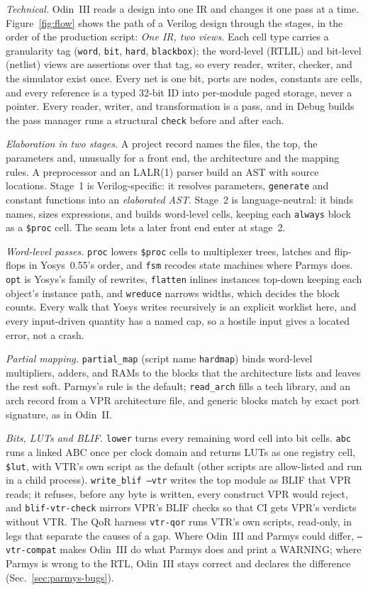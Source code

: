 \documentclass[conference]{IEEEtran}
\newcommand{\code}[1]{\texttt{#1}}
\begin{document}
\emph{Technical.} Odin~III reads a design into one IR and changes it one pass at a time. Figure~\ref{fig:flow} shows the path of a Verilog design through the stages, in the order of the production script:
\emph{One IR, two views.} Each cell type carries a granularity tag (\code{word}, \code{bit}, \code{hard}, \code{blackbox}); the word-level (RTLIL) and bit-level (netlist) views are assertions over that tag, so every reader, writer, checker, and the simulator exist once. Every net is one bit, ports are nodes, constants are cells, and every reference is a typed 32-bit ID into per-module paged storage, never a pointer. Every reader, writer, and transformation is a pass, and in Debug builds the pass manager runs a structural \code{check} before and after each.

\emph{Elaboration in two stages.} A project record names the files, the top, the parameters and, unusually for a front end, the architecture and the mapping rules. A preprocessor and an LALR(1) parser build an AST with source locations. Stage~1 is Verilog-specific: it resolves parameters, \code{generate} and constant functions into an \emph{elaborated AST}. Stage~2 is language-neutral: it binds names, sizes expressions, and builds word-level cells, keeping each \code{always} block as a \code{\$proc} cell. The seam lets a later front end enter at stage~2.

\emph{Word-level passes.} \code{proc} lowers \code{\$proc} cells to multiplexer trees, latches and flip-flops in Yosys~0.55's order, and \code{fsm} recodes state machines where Parmys does. \code{opt} is Yosys's family of rewrites, \code{flatten} inlines instances top-down keeping each object's instance path, and \code{wreduce} narrows widths, which decides the block counts. Every walk that Yosys writes recursively is an explicit worklist here, and every input-driven quantity has a named cap, so a hostile input gives a located error, not a crash.

\emph{Partial mapping.} \code{partial\_map} (script name \code{hardmap}) binds word-level multipliers, adders, and RAMs to the blocks that the architecture lists and leaves the rest soft. Parmys's rule is the default; \code{read\_arch} fills a tech library, and an arch record from a VPR architecture file, and generic blocks match by exact port signature, as in Odin~II.

\emph{Bits, LUTs and BLIF.} \code{lower} turns every remaining word cell into bit cells. \code{abc} runs a linked ABC once per clock domain and returns LUTs as one registry cell, \code{\$lut}, with VTR's own script as the default (other scripts are allow-listed and run in a child process). \code{write\_blif --vtr} writes the top module as BLIF that VPR reads; it refuses, before any byte is written, every construct VPR would reject, and \code{blif-vtr-check} mirrors VPR's BLIF checks so that CI gets VPR's verdicts without VTR. The QoR harness \code{vtr-qor} runs VTR's own scripts, read-only, in legs that separate the causes of a gap. Where Odin~III and Parmys could differ, \code{--vtr-compat} makes Odin~III do what Parmys does and print a WARNING; where Parmys is wrong to the RTL, Odin~III stays correct and declares the difference (Sec.~\ref{sec:parmys-bugs}).
\end{document}

